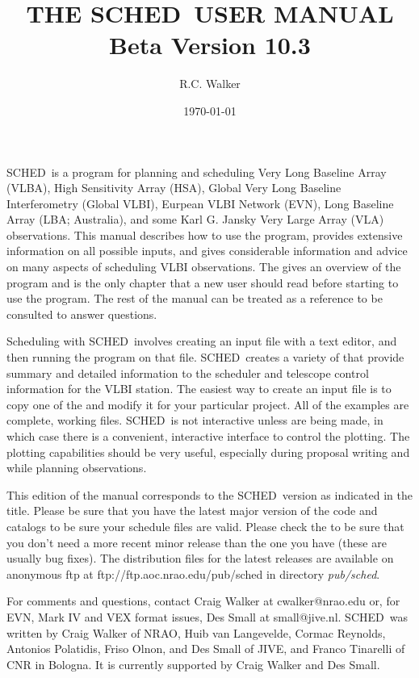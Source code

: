 \documentclass{report}
\newcommand{\schedb}{{\sc SCHED~}}
\begin{document}
\title{THE \schedb USER MANUAL \\  Beta Version 10.3}
\author{R.C. Walker}
\date{\today}
\maketitle

\schedb is a program for planning and scheduling Very Long Baseline
Array (VLBA), High Sensitivity Array (HSA), Global Very Long Baseline
Interferometry (Global VLBI), Eurpean VLBI Network (EVN), Long
Baseline Array (LBA; Australia), and some Karl G. Jansky Very Large
Array (VLA) observations.  This manual describes how to use the
program, provides extensive information on all possible inputs, and
gives considerable information and advice on many aspects of
scheduling VLBI observations.  The 
gives an overview of the program and is the only chapter that a new
user should read before starting to use the program.  The rest of the
manual can be treated as a reference to be consulted to answer
questions.

Scheduling with \schedb involves creating an input file with a text
editor, and then running the program on that file.  \schedb creates a
variety of  that provide summary and
detailed information to the scheduler and telescope control
information for the VLBI station.  The easiest way to create an input
file is to copy one of the  and
modify it for your particular project.  All of the examples are
complete, working files.  \schedb is not interactive unless
 are being made, in which case there is a
convenient, interactive interface to control the plotting.  The
plotting capabilities should be very useful, especially during
proposal writing and while planning observations.

This edition of the manual corresponds to the \schedb version as
indicated in the title.  Please be sure that you have the latest major
version of the code and catalogs to be sure your schedule files are
valid.  Please check the  to be sure that you don't need a more recent
minor release than the one you have (these are usually bug fixes).
The distribution files for the latest releases are available on
anonymous ftp at 
{ftp://ftp.aoc.nrao.edu/pub/sched} in directory {\sl pub/sched}.

For comments and questions, contact Craig Walker at cwalker@nrao.edu
or, for EVN, Mark IV and VEX format issues, Des Small at
small@jive.nl.  \schedb was written by Craig Walker of NRAO, Huib van
Langevelde, Cormac Reynolds, Antonios Polatidis, Friso Olnon, and Des
Small of JIVE, and Franco Tinarelli of CNR in Bologna.  It is
currently supported by Craig Walker and Des Small.
\end{document}
